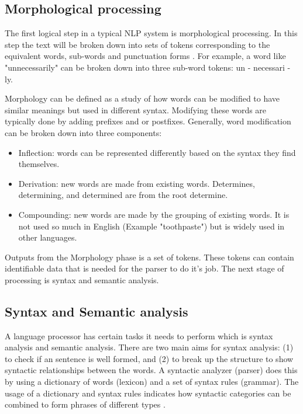 \subsection{Morphological processing}
The first logical step in a typical NLP system is morphological processing. In this step the text will be broken down into sets of tokens corresponding to the equivalent words, sub-words and punctuation forms \cite{Bates9977}. For example, a word like "unnecessarily" can be broken down into three sub-word tokens: un - necessari - ly.

Morphology can be defined as a study of how words can be modified to have similar meanings but used in different syntax. Modifying these words are typically done by adding prefixes and or postfixes. Generally, word modification can be broken down into three components:
\begin{itemize}
    \item Inflection: words can be represented differently based on the syntax they find themselves.
    \item Derivation: new words are made from existing words. Determines, determining, and determined are from the root determine.
    \item Compounding: new words are made by the grouping of existing words. It is not used so much in English (Example "toothpaste") but is widely used in other languages.
\end{itemize}

Outputs from the Morphology phase is a set of tokens. These tokens can contain identifiable data that is needed for the parser to do it's job. The next stage of processing is syntax and semantic analysis.

\subsection{Syntax and Semantic analysis}

A language processor has certain tasks it needs to perform which is syntax analysis and semantic analysis. There are two main aims for syntax analysis: (1) to check if an sentence is well formed, and (2) to break up the structure to show syntactic relationships between the words. A syntactic analyzer (parser) does this by using a dictionary of words (lexicon) and a set of syntax rules (grammar). The usage of a dictionary and syntax rules indicates how syntactic categories can be combined to form phrases of different types \cite{nation2007dissecting,liddy2001natural,feldman1999nlp}.

